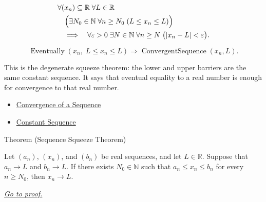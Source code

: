 \begin{remark*}
\[
\begin{aligned}
&\forall (x_n)\subseteq\mathbb{R}\;\forall L\in\mathbb{R}\\
&\quad\Bigl(
  \exists N_0\in\mathbb{N}\;\forall n\ge N_0\;(L\le x_n\le L)
\Bigr)\\
&\quad\Longrightarrow\quad
\forall \varepsilon>0\;\exists N\in\mathbb{N}\;\forall n\ge N\;
\bigl(|x_n-L|<\varepsilon\bigr).
\end{aligned}
\]
\end{remark*}

\begin{remark*}
\[
\operatorname{Eventually}(x_n,\;L\le x_n\le L)
\Longrightarrow
\operatorname{ConvergentSequence}(x_n,L).
\]
\end{remark*}

\begin{remark*}[Interpretation]
This is the degenerate squeeze theorem: the lower and upper barriers are the
same constant sequence. It says that eventual equality to a real number is
enough for convergence to that real number.
\end{remark*}

\begin{remark*}[Dependencies]
\begin{itemize}
  \item \hyperref[def:convergent-sequence]{Convergence of a Sequence}
  \item \hyperref[def:constant-sequence]{Constant Sequence}
\end{itemize}
\end{remark*}


\begin{theorembox}{Theorem (Sequence Squeeze Theorem)}
\begin{theorem}
\label{thm:sequence-squeeze-theorem}

Let $(a_n)$, $(x_n)$, and $(b_n)$ be real sequences, and let
$L\in\mathbb{R}$. Suppose that $a_n\to L$ and $b_n\to L$. If there
exists $N_0\in\mathbb{N}$ such that $a_n\le x_n\le b_n$ for every
$n\ge N_0$, then $x_n\to L$.

\smallskip
\noindent
\hyperref[prf:sequence-squeeze-theorem]{\textit{Go to proof.}}
\end{theorem}
\end{theorembox}

